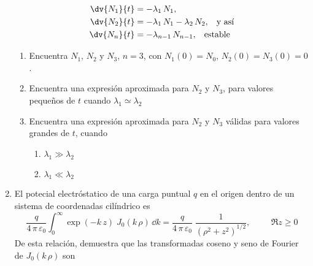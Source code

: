 \begin{enumerate}
\begin{align*}
\dv{N_{1}}{t} &= - \lambda_{1} \, N_{1}, \\
\dv{N_{2}}{t} &= - \lambda_{1} \, N_{1} - \lambda_{2} \, N_{2}, \hspace{0.3cm} \mbox{y así} \\
\dv{N_{n}}{t} &= - \lambda_{n-1} \, N_{n-1}, \hspace{0.3cm} \mbox{estable}
\end{align*} 
\begin{enumerate}[label=\alph*)]
\item Encuentra $N_{1}$, $N_{2}$ y $N_{3}$, $n=3$, con $N_{1}(0)=N_{0}$, $N_{2}(0)=N_{3}(0) =0$.
\item Encuentra una expresión aproximada para $N_{2}$ y $N_{3}$, para valores pequeños de $t$ cuando $\lambda_{1} \simeq \lambda_{2}$
\item Encuentra una expresión aproximada para $N_{2}$ y $N_{3}$ válidas para valores grandes de $t$, cuando
\begin{enumerate}[label=\roman*)]
\item $\lambda_{1} \gg \lambda_{2}$
\item $\lambda_{1} \ll \lambda_{2}$
\end{enumerate}
\end{enumerate}
\item El potecial electróstatico de una carga puntual $q$ en el origen dentro de un sistema de coordenadas cilíndrico es
\[ \dfrac{q}{4 \, \pi \, \varepsilon_{0}} \int_{0}^{\infty} \exp(-k \, z) \; J_{0}(k \, \rho) \, \dd k = \dfrac{q}{4 \, \pi \, \varepsilon_{0}}  \;\dfrac{1}{(\rho^{2} + z^{2})^{1/2}}, \hspace{1cm} \Re{z} \geq 0\]
De esta relación, demuestra que las transformadas coseno y seno de Fourier de $J_{0}(k \, \rho)$ son
\end{enumerate}

